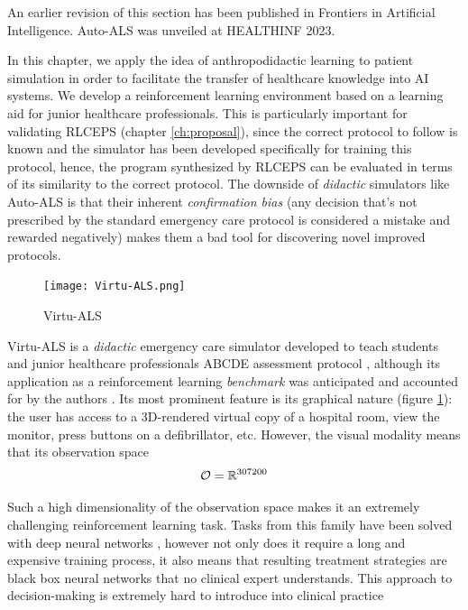 \begin{remark}
  An earlier revision of this section \cite[section 3.1]{liventsevEffectivePatientSimulators2021} has been published in Frontiers in Artificial Intelligence. Auto-ALS was unveiled at HEALTHINF 2023.
\end{remark}


In this chapter, we apply the idea of anthropodidactic learning to patient simulation in order to facilitate the transfer of healthcare knowledge into AI systems.
We develop a reinforcement learning environment based on a learning aid for junior healthcare professionals.
This is particularly important for validating RLCEPS (chapter \ref{ch:proposal}), since the correct protocol to follow is known and the simulator has been developed specifically for training this protocol, hence, the program synthesized by RLCEPS can be evaluated in terms of its similarity to the correct protocol.
The downside of \emph{didactic} simulators like Auto-ALS is that their inherent \emph{confirmation bias} (any decision that's not prescribed by the standard emergency care protocol is considered a mistake and rewarded negatively) makes them a bad tool for discovering novel improved protocols.

\begin{figure}
    \centering
    \texttt{[image: Virtu-ALS.png]}
    \caption{Virtu-ALS}
    \label{fig:virtu-als}
\end{figure}

Virtu-ALS is a \emph{didactic} emergency care simulator developed to teach students and junior healthcare professionals ABCDE assessment protocol \cite{thimInitialAssessmentTreatment2012}, although its application as a reinforcement learning \emph{benchmark} was anticipated and accounted for by the authors \cite{briskAIEnhanceInteractive2018}.
Its most prominent feature is its graphical nature (figure \ref{fig:virtu-als}): the user has access to a 3D-rendered virtual copy of a hospital room, view the monitor, press buttons on a defibrillator, etc.
However, the visual modality means that its observation space 
\begin{equation}
    \mathcal{O} = \mathbb{R}^{307200}
\end{equation}

Such a high dimensionality of the observation space makes it an extremely challenging reinforcement learning task.
Tasks from this family have been solved with deep neural networks \cite{mnihPlayingAtariDeep2013}, however not only does it require a long and expensive training process, it also means that resulting treatment strategies are black box neural networks that no clinical expert understands.
This approach to decision-making is extremely hard to introduce into clinical practice \cite{priceBigDataBlackbox2018,watsonClinicalApplicationsMachine2019}

